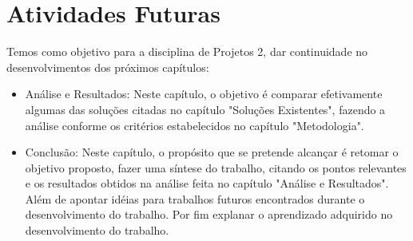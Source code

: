 \chapter{Atividades Futuras}
Temos como objetivo para a disciplina de Projetos 2, dar continuidade no desenvolvimentos dos próximos capítulos:

\begin{itemize}
    \item Análise e Resultados: Neste capítulo, o objetivo é comparar efetivamente algumas das soluções citadas no capítulo "Soluções Existentes", fazendo a análise conforme os critérios estabelecidos no capítulo "Metodologia".
    \item Conclusão: Neste capítulo, o propósito que se pretende alcançar é retomar o objetivo proposto, fazer uma síntese do trabalho, citando os pontos relevantes e os resultados obtidos na análise feita no capítulo "Análise e Resultados". Além de apontar idéias para trabalhos futuros encontrados durante o desenvolvimento do trabalho. Por fim explanar o aprendizado adquirido no desenvolvimento do trabalho.
\end{itemize}